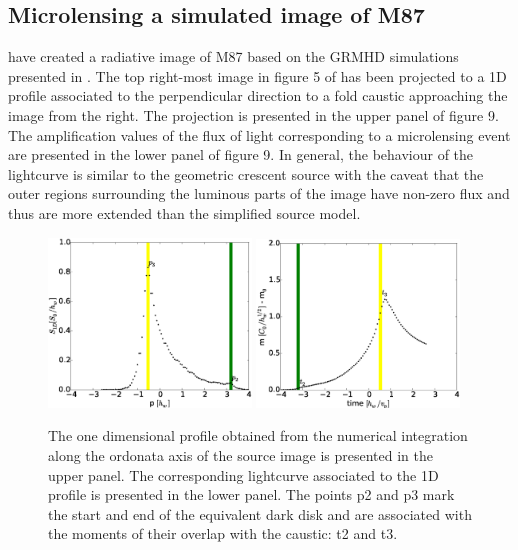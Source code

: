 \documentclass[usenatbib]{mn2e}
\begin{document}
\subsection{Microlensing a simulated image of M87}


\cite{2012MNRAS.421.1517D} have created a radiative image of M87 based on the GRMHD simulations presented in \citep{2009MNRAS.394L.126M}. 
The top right-most image in figure 5 of \cite{2012MNRAS.421.1517D} has been projected to a 1D profile associated to the perpendicular 
direction to a fold caustic approaching the image from the right. The projection is presented in the upper panel of figure 9. 
The amplification values of the flux of light corresponding to a microlensing event are presented in the lower panel of figure 9. 
In general, the behaviour of the lightcurve is similar to the geometric crescent source with the caveat that the outer regions 
surrounding the luminous parts of the image have non-zero flux and thus are more extended than the simplified source model.

\begin{figure}
\centering
    \includegraphics[width = 0.48\textwidth]{figures/M87_shape.eps}
        \includegraphics[width = 0.48\textwidth]{figures/M87_lc.eps}
\caption{\label{fig:M87_plots} The one dimensional profile obtained
  from the numerical integration along the ordonata axis of the source
  image is presented in the upper panel. The corresponding
  lightcurve associated to the 1D profile is presented in the lower
  panel. The points p2 and p3 mark the start and end of the equivalent
  dark disk and are associated with the moments of their overlap with
  the caustic: t2 and t3.}
\end{figure}
\end{document}
